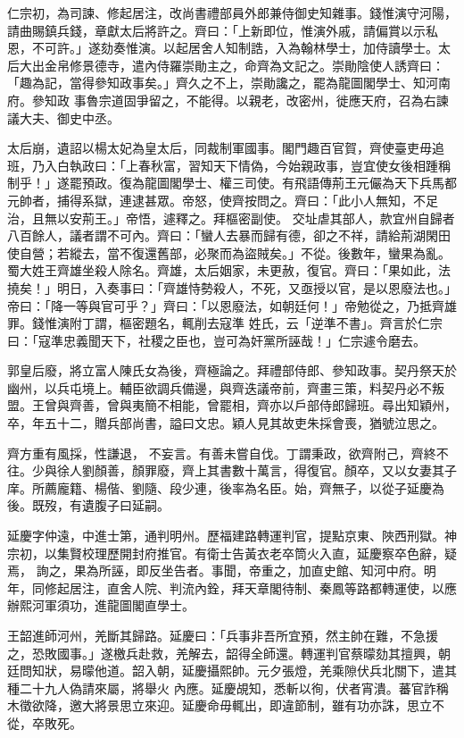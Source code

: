 \begin{pinyinscope}
 仁宗初，為司諫、修起居注，改尚書禮部員外郎兼侍御史知雜事。錢惟演守河陽，請曲賜鎮兵錢，章獻太后將許之。齊曰：「上新即位，惟演外戚，請偏賞以示私恩，不可許。」遂劾奏惟演。以起居舍人知制誥，入為翰林學士，加侍讀學士。太后大出金帛修景德寺，遣內侍羅崇勛主之，命齊為文記之。崇勛陰使人誘齊曰：「趣為記，當得參知政事矣。」齊久之不上，崇勛讒之，罷為龍圖閣學士、知河南府。參知政
 事魯宗道固爭留之，不能得。以親老，改密州，徙應天府，召為右諫議大夫、御史中丞。



 太后崩，遺詔以楊太妃為皇太后，同裁制軍國事。閣門趣百官賀，齊使臺吏毋追班，乃入白執政曰：「上春秋富，習知天下情偽，今始親政事，豈宜使女後相踵稱制乎！」遂罷預政。復為龍圖閣學士、權三司使。有飛語傳荊王元儼為天下兵馬都元帥者，捕得系獄，連逮甚眾。帝怒，使齊按問之。齊曰：「此小人無知，不足治，且無以安荊王。」帝悟，遽釋之。拜樞密副使。
 交址虐其部人，款宜州自歸者八百餘人，議者謂不可內。齊曰：「蠻人去暴而歸有德，卻之不祥，請給荊湖閑田使自營；若縱去，當不復還舊部，必聚而為盜賊矣。」不從。後數年，蠻果為亂。蜀大姓王齊雄坐殺人除名。齊雄，太后姻家，未更赦，復官。齊曰：「果如此，法撓矣！」明日，入奏事曰：「齊雄恃勢殺人，不死，又亟授以官，是以恩廢法也。」帝曰：「降一等與官可乎？」齊曰：「以恩廢法，如朝廷何！」帝勉從之，乃抵齊雄罪。錢惟演附丁謂，樞密題名，輒削去寇準
 姓氏，云「逆準不書」。齊言於仁宗曰：「寇準忠義聞天下，社稷之臣也，豈可為奸黨所誣哉！」仁宗遽令磨去。



 郭皇后廢，將立富人陳氏女為後，齊極論之。拜禮部侍郎、參知政事。契丹祭天於幽州，以兵屯境上。輔臣欲調兵備邊，與齊迭議帝前，齊畫三策，料契丹必不叛盟。王曾與齊善，曾與夷簡不相能，曾罷相，齊亦以戶部侍郎歸班。尋出知穎州，卒，年五十二，贈兵部尚書，謚曰文忠。穎人見其故吏朱採會喪，猶號泣思之。



 齊方重有風採，性謙退，
 不妄言。有善未嘗自伐。丁謂秉政，欲齊附己，齊終不往。少與徐人劉顏善，顏罪廢，齊上其書數十萬言，得復官。顏卒，又以女妻其子庠。所薦龐籍、楊偕、劉隨、段少連，後率為名臣。始，齊無子，以從子延慶為後。既歿，有遺腹子曰延嗣。



 延慶字仲遠，中進士第，通判明州。歷福建路轉運判官，提點京東、陜西刑獄。神宗初，以集賢校理歷開封府推官。有衛士告黃衣老卒筒火入直，延慶察卒色辭，疑焉，
 詢之，果為所誣，即反坐告者。事聞，帝重之，加直史館、知河中府。明年，同修起居注，直舍人院、判流內銓，拜天章閣待制、秦鳳等路都轉運使，以應辦熙河軍須功，進龍圖閣直學士。



 王韶進師河州，羌斷其歸路。延慶曰：「兵事非吾所宜預，然主帥在難，不急援之，恐敗國事。」遂檄兵赴救，羌解去，韶得全師還。轉運判官蔡曚劾其擅興，朝廷問知狀，易曚他道。韶入朝，延慶攝熙帥。元夕張燈，羌乘隙伏兵北關下，遣其種二十九人偽請來屬，將舉火
 內應。延慶覘知，悉斬以徇，伏者宵潰。蕃官詐稱木徵欲降，邀大將景思立來迎。延慶命毋輒出，即違節制，雖有功亦誅，思立不從，卒敗死。




\end{pinyinscope}
